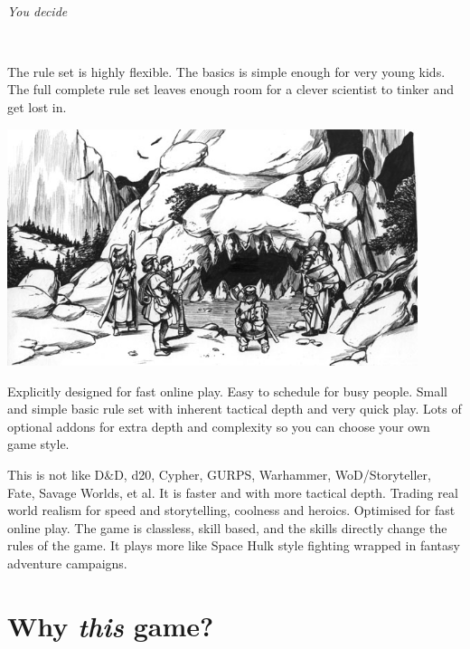 \

\emph{You decide}

\

\noindent
The rule set is highly flexible. The basics is simple enough for very young kids. The full complete rule set leaves enough room for a clever scientist to tinker and get lost in.




\vfill

\begin{center}
\includegraphics[width=120mm]{./fig/cavemouth.jpg}
\end{center}

\vfill




\noindent
Explicitly designed for fast online play. Easy to schedule for busy people. Small and simple basic rule set with inherent tactical depth and very quick play. Lots of optional addons for extra depth and complexity so you can choose your own game style.

This is not like D\&D, d20, Cypher, GURPS, Warhammer, WoD/Storyteller, Fate, Savage Worlds, et al. It is faster and with more tactical depth. Trading real world realism for speed and storytelling, coolness and heroics. Optimised for fast online play. The game is classless, skill based, and the skills directly change the rules of the game. It plays more like Space Hulk style fighting wrapped in fantasy adventure campaigns.







\clearpage %

\noindent
\section*{Why \emph{this} game?}

